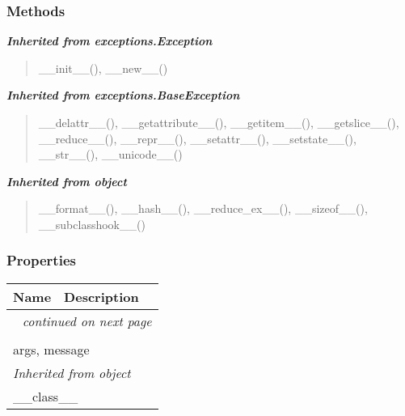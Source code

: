 
  \subsubsection{Methods}


\large{\textbf{\textit{Inherited from exceptions.Exception}}}

\begin{quote}
\_\_init\_\_(), \_\_new\_\_()
\end{quote}

\large{\textbf{\textit{Inherited from exceptions.BaseException}}}

\begin{quote}
\_\_delattr\_\_(), \_\_getattribute\_\_(), \_\_getitem\_\_(), \_\_getslice\_\_(), \_\_reduce\_\_(), \_\_repr\_\_(), \_\_setattr\_\_(), \_\_setstate\_\_(), \_\_str\_\_(), \_\_unicode\_\_()
\end{quote}

\large{\textbf{\textit{Inherited from object}}}

\begin{quote}
\_\_format\_\_(), \_\_hash\_\_(), \_\_reduce\_ex\_\_(), \_\_sizeof\_\_(), \_\_subclasshook\_\_()
\end{quote}


  \subsubsection{Properties}

    \vspace{-1cm}
\hspace{\varindent}\begin{longtable}{|p{\varnamewidth}|p{\vardescrwidth}|l}
\cline{1-2}
\cline{1-2} \centering \textbf{Name} & \centering \textbf{Description}& \\
\cline{1-2}
\endhead\cline{1-2}\multicolumn{3}{r}{\small\textit{continued on next page}}\\\endfoot\cline{1-2}
\endlastfoot\multicolumn{2}{|l|}{\textit{Inherited from exceptions.BaseException}}\\
\multicolumn{2}{|p{\varwidth}|}{\raggedright args, message}\\
\cline{1-2}
\multicolumn{2}{|l|}{\textit{Inherited from object}}\\
\multicolumn{2}{|p{\varwidth}|}{\raggedright \_\_class\_\_}\\
\cline{1-2}
\end{longtable}

